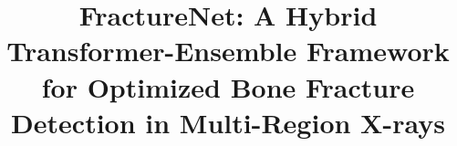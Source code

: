 \documentclass{styles/svproc}
\begin{document}
\mainmatter              %

\title{FractureNet: A Hybrid Transformer-Ensemble Framework for Optimized Bone Fracture Detection in Multi-Region X-rays}
%
%


\maketitle              %
\end{document}
